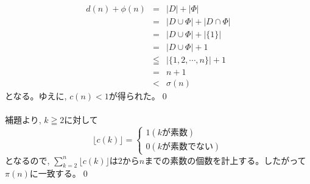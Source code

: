 \documentclass[twocolumn]{jbook}
\theoremstyle{definition}
\newcommand{\disp}{\displaystyle}
\newcommand{\beqn}{\begin{eqnarray*}}
\newcommand{\eeqn}{\end{eqnarray*}}
\newcommand{\bcas}{\begin{cases}}
\newcommand{\ecas}{\end{cases}}
\renewcommand{\leq}{\leqq}
\renewcommand{\geq}{\geqq}
\begin{document}
\beqn
d(n) + \phi(n) &=& |D| + |\Phi|\\
&=& |D\cup \Phi| + |D \cap \Phi|\\
&=& |D\cup \Phi| + | \{ 1 \} |\\
&=& |D\cup \Phi| + 1 \\
&\leq & |\{ 1,2,\cdots, n\}| + 1\\
&=& n+1\\
&<& \sigma(n) 
\eeqn
となる。ゆえに, $c(n) <1$が得られた。\qed\\
\\
補題より, $k\geq 2$に対して
\[
\lfloor c(k) \rfloor = \bcas
1　(kが素数)\\
0　(kが素数でない)
\ecas
\]
となるので, $\disp\sum_{k=2}^{n} \lfloor c(k) \rfloor $は$2$から$n$までの素数の個数を計上する。したがって$\pi(n)$に一致する。\qed
\end{document}
